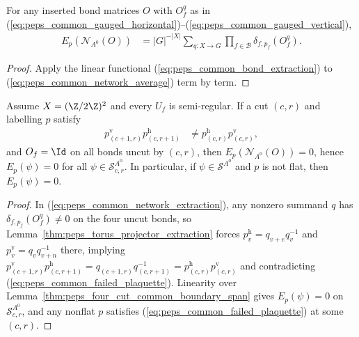 \begin{lemma}%
    \label{thm:peps_four_cut_common_network_extraction}
    \leanok
    For any inserted bond matrices $O$ with $O^q_f$ as in (\ref{eq:peps_common_gauged_horizontal})--(\ref{eq:peps_common_gauged_vertical}),
    \begin{align}
        E_p(\mathcal N_{A^0}(O))
         & =|G|^{-|X|}\sum_{q:X\to G}
        \prod_{f\in\mathcal B}\delta_{f,p_f}(O^q_f).
        \label{eq:peps_common_network_extraction}
    \end{align}
\end{lemma}
\begin{proof}\leanok
    Apply the linear functional (\ref{eq:peps_common_bond_extraction}) to (\ref{eq:peps_common_network_average}) term by term.
\end{proof}

\begin{lemma}%
    \label{thm:peps_four_cut_common_nonflat_vanish}
    \leanok
    Assume $X=(\Z/2\Z)^2$ and every $U_f$ is semi-regular. If a cut $(c,r)$ and labelling $p$ satisfy
    \begin{align}
        p^{\mathrm v}_{(c+1,r)}p^{\mathrm h}_{(c,r+1)}
         & \ne p^{\mathrm h}_{(c,r)}p^{\mathrm v}_{(c,r)},
        \label{eq:peps_common_failed_plaquette}
    \end{align}
    and $O_f=\Id$ on all bonds uncut by $(c,r)$, then $E_p(\mathcal N_{A^0}(O))=0$, hence $E_p(\psi)=0$ for all $\psi\in\mathcal S^{A^0}_{c,r}$. In particular, if $\psi\in\mathcal S^{A^0}$ and $p$ is not flat, then $E_p(\psi)=0$.
\end{lemma}
\begin{proof}\leanok
    In (\ref{eq:peps_common_network_extraction}), any nonzero summand $q$ has $\delta_{f,p_f}(O^q_f)\ne0$ on the four uncut bonds, so Lemma~\ref{thm:peps_torus_projector_extraction} forces $p^{\mathrm h}_v=q_{v+e}q_v^{-1}$ and $p^{\mathrm v}_v=q_vq_{v+n}^{-1}$ there, implying $p^{\mathrm v}_{(c+1,r)}p^{\mathrm h}_{(c,r+1)}=q_{(c+1,r)}q_{(c,r+1)}^{-1}=p^{\mathrm h}_{(c,r)}p^{\mathrm v}_{(c,r)}$ and contradicting (\ref{eq:peps_common_failed_plaquette}). Linearity over Lemma~\ref{thm:peps_four_cut_common_boundary_span} gives $E_p(\psi)=0$ on $\mathcal S^{A^0}_{c,r}$, and any nonflat $p$ satisfies (\ref{eq:peps_common_failed_plaquette}) at some $(c,r)$.
\end{proof}

